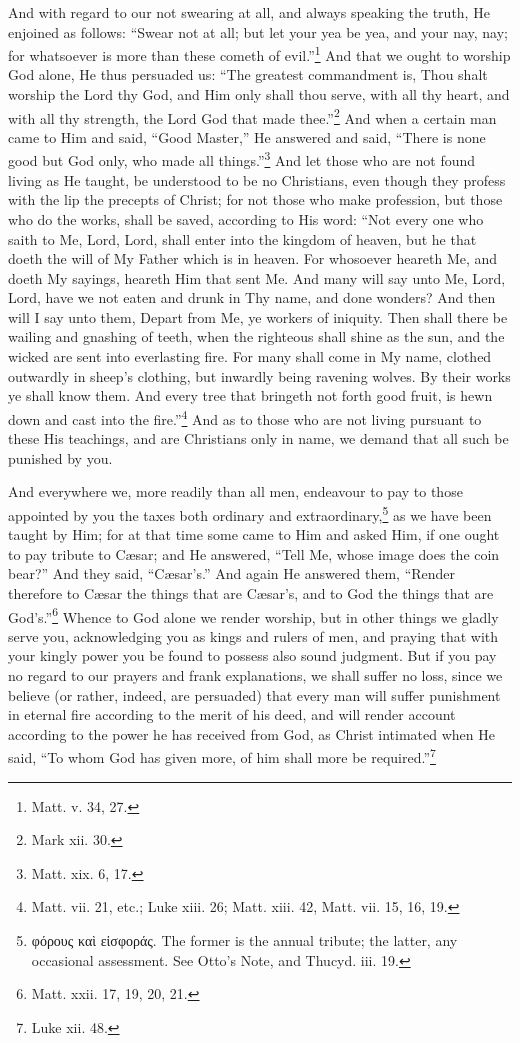 And with regard to our not swearing at all, and always speaking the truth, He enjoined as follows: “Swear not at all; but let your yea be yea, and your nay, nay; for whatsoever is more than these cometh of evil.”\footnote{Matt. v. 34, 27.} And that we ought to worship God alone, He thus persuaded us: “The greatest commandment is, Thou shalt worship the Lord thy God, and Him only shall thou serve, with all thy heart, and with all thy strength, the Lord God that made thee.”\footnote{Mark xii. 30.} And when a certain man came to Him and said, “Good Master,” He answered and said, “There is none good but God only, who made all things.”\footnote{Matt. xix. 6, 17.} And let those who are not found living as He taught, be understood to be no Christians, even though they profess with the lip the precepts of Christ; for not those who make profession, but those who do the works, shall be saved, according to His word: “Not every one who saith to Me, Lord, Lord, shall enter into the kingdom of heaven, but he that doeth the will of My Father which is in heaven. For whosoever heareth Me, and doeth My sayings, heareth Him that sent Me. And many will say unto Me, Lord, Lord, have we not eaten and drunk in Thy name, and done wonders? And then will I say unto them, Depart from Me, ye workers of iniquity. Then shall there be wailing and gnashing of teeth, when the righteous shall shine as the sun, and the wicked are sent into everlasting fire. For many shall come in My name, clothed outwardly in sheep’s clothing, but inwardly being ravening wolves. By their works ye shall know them. And every tree that bringeth not forth good fruit, is hewn down and cast into the fire.”\footnote{Matt. vii. 21, etc.; Luke xiii. 26; Matt. xiii. 42, Matt. vii. 15, 16, 19.} And as to those who are not living pursuant to these His teachings, and are Christians only in name, we demand that all such be punished by you.


And everywhere we, more readily than all men, endeavour to pay to those appointed by you the taxes both ordinary and extraordinary,\footnote{\textgreek{φόρους καὶ εἰσφοράς}. The former is the annual tribute; the latter, any occasional assessment. See Otto’s Note, and Thucyd. iii. 19.} as we have been taught by Him; for at that time some came to Him and asked Him, if one ought to pay tribute to Cæsar; and He answered, “Tell Me, whose image does the coin bear?” And they said, “Cæsar’s.” And again He answered them, “Render therefore to Cæsar the things that are Cæsar’s, and to God the things that are God’s.”\footnote{Matt. xxii. 17, 19, 20, 21.} Whence to God alone we render worship, but in other things we gladly serve you, acknowledging you as kings and rulers of men, and praying that with your kingly power you be found to possess also sound judgment. But if you pay no regard to our prayers and frank explanations, we shall suffer no loss, since we believe (or rather, indeed, are persuaded) that every man will suffer punishment in eternal fire according to the merit of his deed, and will render account according to the power he has received from God, as Christ intimated when He said, “To whom God has given more, of him shall more be required.”\footnote{Luke xii. 48.}

